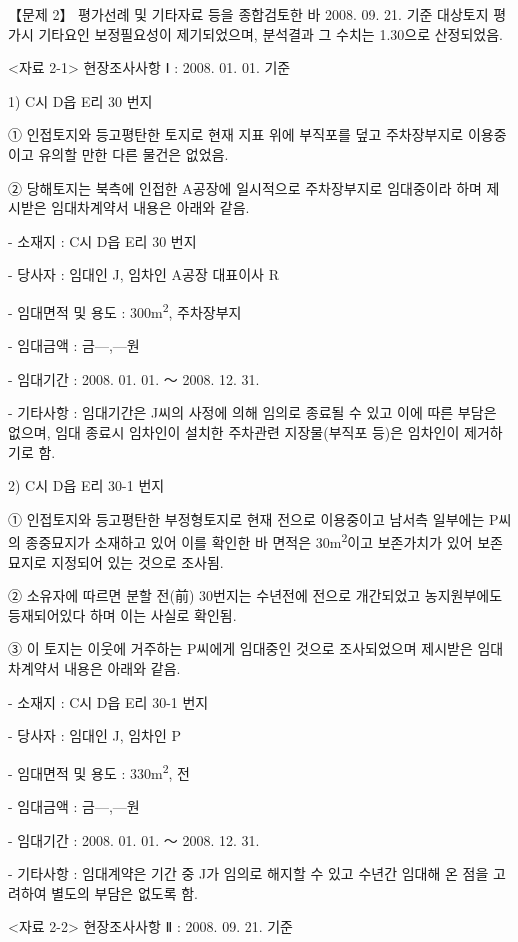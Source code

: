 \begin{longquestion}{【문제 2】}
평가선례 및 기타자료 등을 종합검토한 바 2008. 09. 21. 기준 대상토지 평가시 기타요인 보정필요성이 제기되었으며, 분석결과 그 수치는 1.30으로 산정되었음. \par
<자료 2-1> 현장조사사항 Ⅰ : 2008. 01. 01. 기준 \par
1) C시 D읍 E리 30 번지 \par
① 인접토지와 등고평탄한 토지로 현재 지표 위에 부직포를 덮고 주차장부지로 이용중이고 유의할 만한 다른 물건은 없었음. \par
② 당해토지는 북측에 인접한 A공장에 일시적으로 주차장부지로 임대중이라 하며 제시받은 임대차계약서 내용은 아래와 같음. \par
- 소재지 : C시 D읍 E리 30 번지 \par
- 당사자 : 임대인 J, 임차인 A공장 대표이사 R \par
- 임대면적 및 용도 : 300m\textsuperscript{2}, 주차장부지 \par
- 임대금액 : 금---,---원 \par
- 임대기간 : 2008. 01. 01. ～ 2008. 12. 31. \par
- 기타사항 : 임대기간은 J씨의 사정에 의해 임의로 종료될 수 있고 이에 따른 부담은 없으며, 임대 종료시 임차인이 설치한 주차관련 지장물(부직포 등)은 임차인이 제거하기로 함. \par
2) C시 D읍 E리 30-1 번지 \par
① 인접토지와 등고평탄한 부정형토지로 현재 전으로 이용중이고 남서측 일부에는 P씨의 종중묘지가 소재하고 있어 이를 확인한 바 면적은 30m\textsuperscript{2}이고 보존가치가 있어 보존묘지로 지정되어 있는 것으로 조사됨. \par
② 소유자에 따르면 분할 전(前) 30번지는 수년전에 전으로 개간되었고 농지원부에도 등재되어있다 하며 이는 사실로 확인됨. \par
③ 이 토지는 이웃에 거주하는 P씨에게 임대중인 것으로 조사되었으며 제시받은 임대차계약서 내용은 아래와 같음. \par
- 소재지 : C시 D읍 E리 30-1 번지 \par
- 당사자 : 임대인 J, 임차인 P \par
- 임대면적 및 용도 : 330m\textsuperscript{2}, 전 \par
- 임대금액 : 금---,---원 \par
- 임대기간 : 2008. 01. 01. ～ 2008. 12. 31. \par
- 기타사항 : 임대계약은 기간 중 J가 임의로 해지할 수 있고 수년간 임대해 온 점을 고려하여 별도의 부담은 없도록 함. \par
<자료 2-2> 현장조사사항 Ⅱ : 2008. 09. 21. 기준 \par

\end{longquestion}
